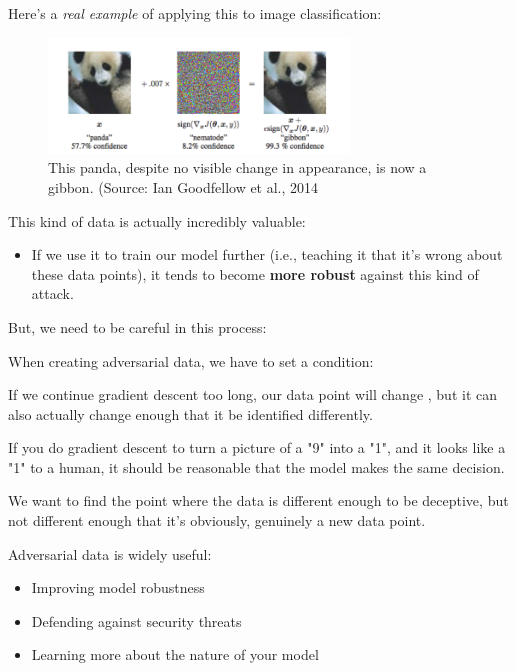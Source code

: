             \miniex Here's a \textit{real example} of applying this to image classification:

            \begin{figure}[H]
                \centering
                \includegraphics[width=80mm,scale=0.5]{images/autoencoder_images/panda.png}
                \caption*{This panda, despite no visible change in appearance, is now a gibbon. (Source: Ian Goodfellow et al., 2014}
            \end{figure}

        This kind of data is actually incredibly valuable: 
        
        \begin{itemize}
            \item If we use it to train our model further (i.e., teaching it that it's wrong about these data points), it tends to become \textbf{more robust} against this kind of attack.
        \end{itemize}

        But, we need to be careful in this process:\\

        \begin{clarification}
            When creating adversarial data, we have to set a  condition:

            If we continue gradient descent too long, our data point will change , but it can also actually change enough that it  be identified differently.
        \end{clarification}

        \miniex If you do gradient descent to turn a picture of a "9" into a "1", and it looks like a "1" to a human, it should be reasonable that the model makes the same decision.

        We want to find the point where the data is different enough to be deceptive, but not different enough that it's obviously, genuinely a new data point.

        Adversarial data is widely useful:

        \begin{itemize}
            \item Improving model robustness
            \item Defending against security threats
            \item Learning more about the nature of your model
        \end{itemize}


